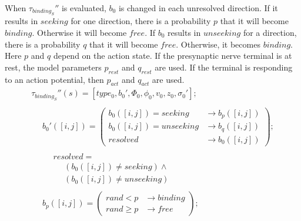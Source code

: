 \documentclass{acm_proc_article-sp}
\begin{document}
When $\tau_{binding_S}''$ is evaluated, $b_0$ is changed 
in each unresolved direction.  If it results in $seeking$ for one
direction, there is a probability $p$ that it will become
$binding$.  Otherwise it will become $free$.  If $b_0$ results
in $unseeking$ for a direction, there is a probability $q$ 
that it will become $free$.  Otherwise, it becomes $binding$.
Here $p$ and $q$ depend on the action state.  If the 
presynaptic nerve terminal is at rest, the model parameters 
$p_{rest}$ and $q_{rest}$ are used.  If the terminal is
responding to an action potential, then $p_{act}$ and $q_{act}$ 
are used.
\begin{displaymath} \begin{array}{l}
\tau_{binding_S}''(s) = [type_0, b_0', \Phi_0, \phi_0, v_0, z_0, \sigma_0']; \\
\\
\hspace{16pt} b_0'([i, j]) = \left( \begin{array}{ll} b_0([i, j]) = seeking   & \rightarrow b_p([i, j]) \\
                                                      b_0([i, j]) = unseeking & \rightarrow b_q([i, j]) \\
                                                      resolved                & \rightarrow b_0([i, j]) \end{array} \right); \\
\\
\hspace{16pt} \hspace{16pt} resolved = \\
\hspace{16pt} \hspace{16pt} \hspace{16pt} (b_0([i, j]) \ne seeking) \wedge \\
\hspace{16pt} \hspace{16pt} \hspace{16pt} (b_0([i, j]) \ne unseeking) \\
\\
\hspace{16pt} b_p([i, j]) = \left( \begin{array}{ll} rand < p   & \rightarrow binding \\
                                                     rand \ge p & \rightarrow free \end{array} \right); \\
\\

\end{array}
\end{displaymath}
\end{document}
